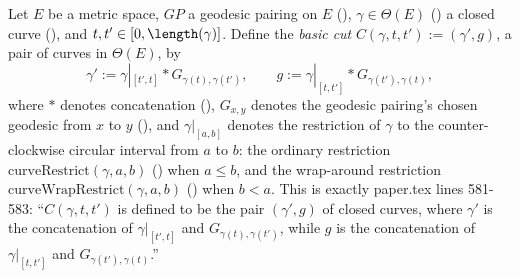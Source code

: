 \begin{definition}
  Let $E$ be a metric space, $GP$ a geodesic pairing on $E$ (), $\gamma \in
  \Theta(E)$ () a closed curve (), and $t,t' \in
  [0,\length(\gamma)]$. Define the \emph{basic cut} $C(\gamma,t,t') := (\gamma',g)$, a pair of
  curves in $\Theta(E)$, by
  \[
    \gamma' := \gamma|_{[t',t]} * G_{\gamma(t),\gamma(t')}
    , \qquad
    g := \gamma|_{[t,t']} * G_{\gamma(t'),\gamma(t)}
    ,
  \]
  where $*$ denotes concatenation (), $G_{x,y}$ denotes the geodesic pairing's
  chosen geodesic from $x$ to $y$ (), and $\gamma|_{[a,b]}$ denotes the
  restriction of $\gamma$ to the counter-clockwise circular interval from $a$ to $b$: the ordinary
  restriction $\mathrm{curveRestrict}(\gamma,a,b)$ () when $a \le b$, and the
  wrap-around restriction $\mathrm{curveWrapRestrict}(\gamma,a,b)$ ()
  when $b < a$. This is exactly paper.tex lines 581-583: ``$C(\gamma,t,t')$ is defined to be the
  pair $(\gamma',g)$ of closed curves, where $\gamma'$ is the concatenation of $\gamma|_{[t',t]}$
  and $G_{\gamma(t),\gamma(t')}$, while $g$ is the concatenation of $\gamma|_{[t,t']}$ and
  $G_{\gamma(t'),\gamma(t)}$.''


\end{definition}
